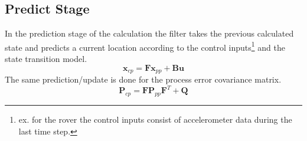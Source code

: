 \documentclass{article}
\begin{document}
\subsection{Predict Stage}
In the prediction stage of the calculation the filter takes the previous calculated state and predicts a current location according to the control inputs\footnote{ex. for the rover the control inputs consist of accelerometer data during the last time step.} and the state transition model.
\begin{equation}
\textbf{x}_{cp}=\textbf{F}\textbf{x}_{pp}+\textbf{B}\textbf{u}
\end{equation} 
The same prediction/update is done for the process error covariance matrix.
\begin{equation}
\textbf{P}_{cp}=\textbf{F}\textbf{P}_{pp}\textbf{F}^T+\textbf{Q}
\end{equation}
\end{document}
